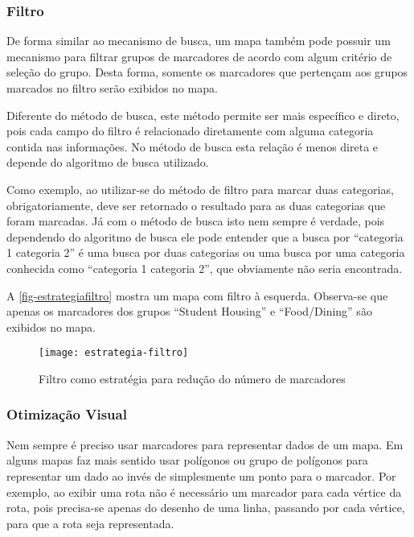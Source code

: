 	
	\subsubsection{Filtro}
	De forma similar ao mecanismo de busca, um mapa também pode possuir um mecanismo para filtrar grupos de marcadores de acordo com algum critério de seleção do grupo. Desta forma, somente os marcadores que pertençam aos grupos marcados no filtro serão exibidos no mapa. 
	
	Diferente do método de busca, este método permite ser mais específico e direto, pois cada campo do filtro é relacionado diretamente com alguma categoria contida nas informações. No método de busca esta relação é menos direta e depende do algoritmo de busca utilizado.  
	
	Como exemplo, ao utilizar-se do método de filtro para marcar duas categorias, obrigatoriamente, deve ser retornado o resultado para as duas categorias que foram marcadas. Já com o método de busca isto nem sempre é verdade, pois dependendo do algoritmo de busca ele pode entender que a busca por ``categoria 1 categoria 2'' é uma busca por duas categorias ou uma busca por uma categoria conhecida como ``categoria 1 categoria 2'', que obviamente não seria encontrada. 
		
	A \autoref{fig-estrategiafiltro} mostra um mapa com filtro à esquerda. Observa-se que apenas os marcadores dos grupos  ``Student Housing'' e ``Food/Dining''  são exibidos no mapa.
	 \begin{figure}[htb]
	\caption{\label{fig-estrategiafiltro}Filtro como estratégia para redução do número de marcadores}
	\begin{center}
	    \texttt{[image: estrategia-filtro]}
	\end{center}
	\end{figure}
	 
	\subsubsection{Otimização Visual}
	Nem sempre é preciso usar marcadores para representar dados de um mapa. Em alguns mapas faz mais sentido usar polígonos ou grupo de polígonos para representar um dado ao invés de simplesmente um ponto para o marcador. Por exemplo, ao exibir uma rota  não é necessário um marcador para cada vértice da rota, pois precisa-se apenas do desenho de uma linha, passando por cada vértice, para que a rota seja representada.
	
